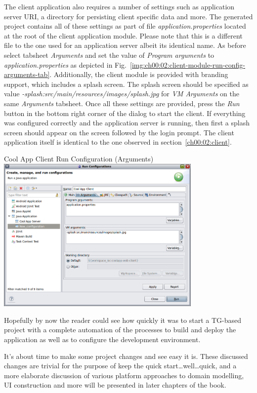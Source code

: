   The client application also requires a number of settings such as application server URI, a directory for persisting client specific data and more.
  The generated project contains all of these settings as part of file \emph{application.properties} located at the root of the client application module.
  Please note that this is a different file to the one used for an application server albeit its identical name.
  As before select tabsheet \emph{Arguments} and set the value of \emph{Program arguments} to \emph{application.properties} as depicted in Fig.~\ref{img:ch00:02:client-module-run-config-arguments-tab}.
  Additionally, the client module is provided with branding support, which includes a splash screen.
  The splash screen should be specified as value \emph{-splash:src/main/resources/images/splash.jpg} for \emph{VM Arguments} on the same \emph{Arguments} tabsheet.
  Once all these settings are provided, press the \emph{Run} button in the bottom right corner of the dialog to start the client.
  If everything was configured correctly and the application server is running, then first a splash screen should appear on the screen followed by the login prompt.
  The client application itself is identical to the one observed in section~\ref{ch00:02:client}.

  \begin{image}{Cool App Client Run Configuration (Arguments)}{\label{img:ch00:02:client-module-run-config-arguments-tab}}    
    \includegraphics[width=0.75\textwidth]{parts/00-part/chapters/01-application-modules/images/16-client-module-run-config-arguments-tab.png}
  \end{image}

  Hopefully by now the reader could see how quickly it was to start a TG-based project with a complete automation of the processes to build and deploy the application as well as to configure the development environment.
  
  It's about time to make some project changes and see easy it is.
  These discussed changes are trivial for the purpose of keep the quick start\ldots well\ldots quick, and a more elaborate discussion of various platform approaches to domain modelling, UI construction and more will be presented in later chapters of the book.